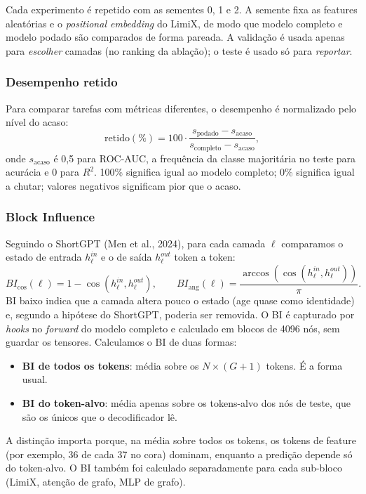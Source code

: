 \documentclass[12pt,a4paper]{article}
\begin{document}
Cada experimento é repetido com as sementes 0, 1 e 2. A semente fixa as features aleatórias e o \emph{positional embedding} do LimiX, de modo que modelo completo e modelo podado são comparados de forma pareada. A validação é usada apenas para \emph{escolher} camadas (no ranking da ablação); o teste é usado só para \emph{reportar}.

\subsubsection{Desempenho retido}

Para comparar tarefas com métricas diferentes, o desempenho é normalizado pelo nível do acaso:
\begin{equation}
\text{retido}(\%) = 100 \cdot \frac{s_{\text{podado}} - s_{\text{acaso}}}{s_{\text{completo}} - s_{\text{acaso}}},
\end{equation}
onde $s_{\text{acaso}}$ é 0,5 para ROC-AUC, a frequência da classe majoritária no teste para acurácia e 0 para $R^2$. 100\% significa igual ao modelo completo; 0\% significa igual a chutar; valores negativos significam pior que o acaso.

\subsubsection{Block Influence}

Seguindo o ShortGPT (Men et al., 2024), para cada camada $\ell$ comparamos o estado de entrada $h_\ell^{in}$ e o de saída $h_\ell^{out}$ token a token:
\begin{equation}
BI_{\cos}(\ell) = 1 - \cos\!\left(h_\ell^{in}, h_\ell^{out}\right), \qquad
BI_{\text{ang}}(\ell) = \frac{\arccos\!\left(\cos(h_\ell^{in}, h_\ell^{out})\right)}{\pi}.
\end{equation}
BI baixo indica que a camada altera pouco o estado (age quase como identidade) e, segundo a hipótese do ShortGPT, poderia ser removida. O BI é capturado por \emph{hooks} no \emph{forward} do modelo completo e calculado em blocos de 4096 nós, sem guardar os tensores. Calculamos o BI de duas formas:
\begin{itemize}
  \item \textbf{BI de todos os tokens}: média sobre os $N \times (G+1)$ tokens. É a forma usual.
  \item \textbf{BI do token-alvo}: média apenas sobre os tokens-alvo dos nós de teste, que são os únicos que o decodificador lê.
\end{itemize}
A distinção importa porque, na média sobre todos os tokens, os tokens de feature (por exemplo, 36 de cada 37 no cora) dominam, enquanto a predição depende só do token-alvo. O BI também foi calculado separadamente para cada sub-bloco (LimiX, atenção de grafo, MLP de grafo).
\end{document}

